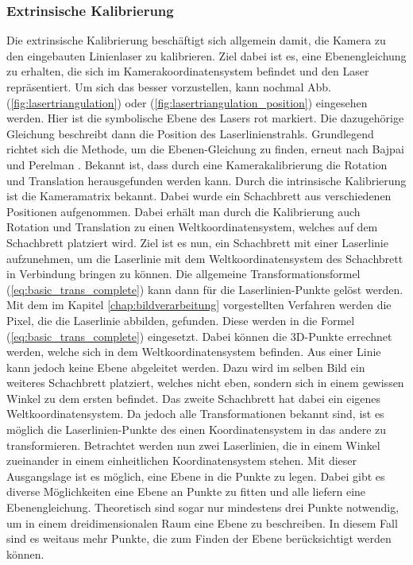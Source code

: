 		\subsubsection{Extrinsische Kalibrierung}
		Die extrinsische Kalibrierung beschäftigt sich allgemein damit, die Kamera zu den eingebauten Linienlaser zu kalibrieren. Ziel dabei ist es, eine Ebenengleichung zu erhalten, die sich im Kamerakoordinatensystem befindet und den Laser repräsentiert. Um sich das besser vorzustellen, kann nochmal Abb. (\ref{fig:lasertriangulation}) oder (\ref{fig:lasertriangulation_position}) eingesehen werden. Hier ist die symbolische Ebene des Lasers rot markiert. Die dazugehörige Gleichung beschreibt dann die Position des Laserlinienstrahls. Grundlegend richtet sich die Methode, um die Ebenen-Gleichung zu finden, erneut nach Bajpai und Perelman \citep[vgl.][]{baj-per}. \newline
		Bekannt ist, dass durch eine Kamerakalibrierung die Rotation und Translation herausgefunden werden kann. Durch die intrinsische Kalibrierung ist die Kameramatrix bekannt. Dabei wurde ein Schachbrett aus verschiedenen Positionen aufgenommen. Dabei erhält man durch die Kalibrierung auch Rotation und Translation zu einen Weltkoordinatensystem, welches auf dem Schachbrett platziert wird. Ziel ist es nun, ein Schachbrett mit einer Laserlinie aufzunehmen, um die Laserlinie mit dem Weltkoordinatensystem des Schachbrett in Verbindung bringen zu können. Die allgemeine Transformationsformel (\ref{eq:basic_trans_complete}) kann dann für die Laserlinien-Punkte gelöst werden. Mit dem im Kapitel \ref{chap:bildverarbeitung} vorgestellten Verfahren werden die Pixel, die die Laserlinie abbilden, gefunden. Diese werden in die Formel (\ref{eq:basic_trans_complete}) eingesetzt. Dabei können die 3D-Punkte errechnet werden, welche sich in dem Weltkoordinatensystem befinden. Aus einer Linie kann jedoch keine Ebene abgeleitet werden. Dazu wird im selben Bild ein weiteres Schachbrett platziert, welches nicht eben, sondern sich in einem gewissen Winkel zu dem ersten befindet. Das zweite Schachbrett hat dabei ein eigenes Weltkoordinatensystem. Da jedoch alle Transformationen bekannt sind, ist es möglich die Laserlinien-Punkte des einen Koordinatensystem in das andere zu transformieren. Betrachtet werden nun zwei Laserlinien, die in einem Winkel zueinander in einem einheitlichen Koordinatensystem stehen. Mit dieser Ausgangslage ist es möglich, eine Ebene in die Punkte zu legen. Dabei gibt es diverse Möglichkeiten eine Ebene an Punkte zu fitten und alle liefern eine Ebenengleichung. Theoretisch sind sogar nur mindestens drei Punkte notwendig, um in einem dreidimensionalen Raum eine Ebene zu beschreiben. In diesem Fall sind es weitaus mehr Punkte, die zum Finden der Ebene berücksichtigt werden können. \newline
